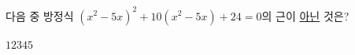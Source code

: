다음 중 방정식 $(x^2-5x)^2+10(x^2-5x)+24=0$의 근이 \underline{아닌} 것은?
\begin{choices32}{$1$}{$2$}{$3$}{$4$}{$5$}\end{choices32}
